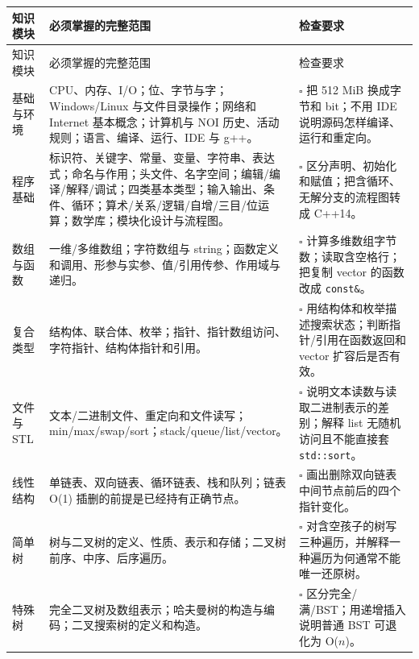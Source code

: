 \documentclass[a4paper,11pt]{article}
\newcommand{\code}[1]{\texttt{#1}}
\begin{document}
\begingroup
\small
\begin{longtable}{L{2.5cm} L{8.6cm} L{5.5cm}}
\toprule
知识模块 & 必须掌握的完整范围 & 检查要求 \\
\midrule
\endfirsthead
\toprule
知识模块 & 必须掌握的完整范围 & 检查要求 \\
\midrule
\endhead
\endfoot
\bottomrule
\endlastfoot

基础与环境
& CPU、内存、I/O；位、字节与字；Windows/Linux 与文件目录操作；网络和 Internet 基本概念；计算机与 NOI 历史、活动规则；语言、编译、运行、IDE 与 g++。
& $\square$ 把 512 MiB 换成字节和 bit；不用 IDE 说明源码怎样编译、运行和重定向。 \\[2mm]

程序基础
& 标识符、关键字、常量、变量、字符串、表达式；命名与作用；头文件、名字空间；编辑/编译/解释/调试；四类基本类型；输入输出、条件、循环；算术/关系/逻辑/自增/三目/位运算；数学库；模块化设计与流程图。
& $\square$ 区分声明、初始化和赋值；把含循环、无解分支的流程图转成 C++14。 \\[2mm]

数组与函数
& 一维/多维数组；字符数组与 string；函数定义和调用、形参与实参、值/引用传参、作用域与递归。
& $\square$ 计算多维数组字节数；读取含空格行；把复制 vector 的函数改成 \code{const\&}。 \\[2mm]

复合类型
& 结构体、联合体、枚举；指针、指针数组访问、字符指针、结构体指针和引用。
& $\square$ 用结构体和枚举描述搜索状态；判断指针/引用在函数返回和 vector 扩容后是否有效。 \\[2mm]

文件与 STL
& 文本/二进制文件、重定向和文件读写；min/max/swap/sort；stack/queue/list/vector。
& $\square$ 说明文本读数与读取二进制表示的差别；解释 list 无随机访问且不能直接套 \code{std::sort}。 \\[2mm]

线性结构
& 单链表、双向链表、循环链表、栈和队列；链表 O(1) 插删的前提是已经持有正确节点。
& $\square$ 画出删除双向链表中间节点前后的四个指针变化。 \\[2mm]

简单树
& 树与二叉树的定义、性质、表示和存储；二叉树前序、中序、后序遍历。
& $\square$ 对含空孩子的树写三种遍历，并解释一种遍历为何通常不能唯一还原树。 \\[2mm]

特殊树
& 完全二叉树及数组表示；哈夫曼树的构造与编码；二叉搜索树的定义和构造。
& $\square$ 区分完全/满/BST；用递增插入说明普通 BST 可退化为 O($n$)。 \\[2mm]


\end{longtable}
\end{document}
